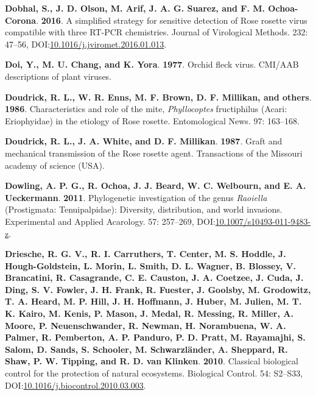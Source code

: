 \documentclass[12pt,final,CPage]{ufthesis}
\newlength{\cslhangindent}
\newenvironment{CSLReferences}[2] %
{%
	\setlength{\parindent}{0pt}
	\ifodd #1 \everypar{\setlength{\hangindent}{\cslhangindent}}\ignorespaces\fi
	\ifnum #2 > 0
	\setlength{\parskip}{#2\baselineskip}
	\fi
}%
{}
\begin{document}
{\begin{CSLReferences}{1}{0}
  \leavevmode{}%
  \textbf{Dobhal, S., J. D. Olson, M. Arif, J. A. G. Suarez, and F. M. Ochoa-Corona}. \textbf{2016}. A simplified strategy for sensitive detection of {Rose rosette virus} compatible with three {RT}-{PCR} chemistries. Journal of Virological Methods. 232: 47--56, DOI:\href{https://doi.org/10.1016/j.jviromet.2016.01.013}{10.1016/j.jviromet.2016.01.013}.

  \leavevmode{}%
  \textbf{Doi, Y., M. U. Chang, and K. Yora}. \textbf{1977}. Orchid fleck virus. {CMI/AAB} descriptions of plant viruses.

  \leavevmode{}%
  \textbf{Doudrick, R. L., W. R. Enns, M. F. Brown, D. F. Millikan, and others}. \textbf{1986}. Characteristics and role of the mite, {\emph{Phyllocoptes} fructiphilus} ({Acari}: {Eriophyidae}) in the etiology of {Rose rosette}. Entomological News. 97: 163--168.

  \leavevmode{}%
  \textbf{Doudrick, R. L., J. A. White, and D. F. Millikan}. \textbf{1987}. Graft and mechanical transmission of the {Rose rosette} agent. Transactions of the {Missouri} academy of science {(USA)}.

  \leavevmode{}%
  \textbf{Dowling, A. P. G., R. Ochoa, J. J. Beard, W. C. Welbourn, and E. A. Ueckermann}. \textbf{2011}. Phylogenetic investigation of the genus {\emph{Raoiella}} ({Prostigmata}: {Tenuipalpidae}): Diversity, distribution, and world invasions. Experimental and Applied Acarology. 57: 257--269, DOI:\href{https://doi.org/10.1007/s10493-011-9483-z}{10.1007/s10493-011-9483-z}.

  \leavevmode{}%
  \textbf{Driesche, R. G. V., R. I. Carruthers, T. Center, M. S. Hoddle, J. Hough-Goldstein, L. Morin, L. Smith, D. L. Wagner, B. Blossey, V. Brancatini, R. Casagrande, C. E. Causton, J. A. Coetzee, J. Cuda, J. Ding, S. V. Fowler, J. H. Frank, R. Fuester, J. Goolsby, M. Grodowitz, T. A. Heard, M. P. Hill, J. H. Hoffmann, J. Huber, M. Julien, M. T. K. Kairo, M. Kenis, P. Mason, J. Medal, R. Messing, R. Miller, A. Moore, P. Neuenschwander, R. Newman, H. Norambuena, W. A. Palmer, R. Pemberton, A. P. Panduro, P. D. Pratt, M. Rayamajhi, S. Salom, D. Sands, S. Schooler, M. Schwarzländer, A. Sheppard, R. Shaw, P. W. Tipping, and R. D. van Klinken}. \textbf{2010}. Classical biological control for the protection of natural ecosystems. Biological Control. 54: S2--S33, DOI:\href{https://doi.org/10.1016/j.biocontrol.2010.03.003}{10.1016/j.biocontrol.2010.03.003}.


\end{CSLReferences}}
\end{document}
